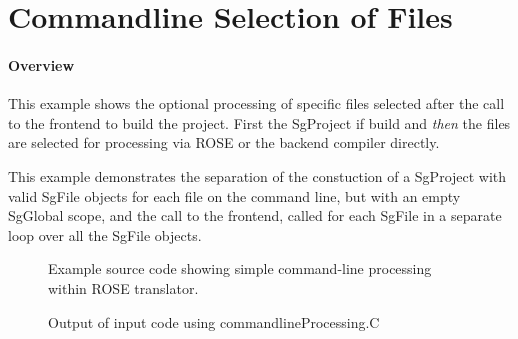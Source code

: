 \section{Commandline Selection of Files}

\paragraph{Overview} This example shows the optional processing of specific files selected
after the call to the frontend to build the project.  First the SgProject if build and
{\em then} the files are selected for processing via ROSE or the backend compiler
directly.

   This example demonstrates the separation of the constuction of a SgProject with
valid SgFile objects for each file on the command line, but with an empty SgGlobal scope,
and the call to the frontend, called for each SgFile in a separate loop over all the 
SgFile objects.

\begin{figure}[!h]
{\indent
{\mySmallFontSize

\label{Tutorial:exampleCommandlineProcessing}

\begin{latexonly}
   
\end{latexonly}

\begin{htmlonly}
   
\end{htmlonly}

}
}
\caption{Example source code showing simple command-line processing within ROSE translator.}
\end{figure}


\begin{figure}[!h]
{\indent
{\mySmallFontSize

\label{Tutorial:exampleOutput_CommandlineProcessing}

\begin{latexonly}
   
\end{latexonly}

\begin{htmlonly}
   
\end{htmlonly}

}
}
\caption{Output of input code using commandlineProcessing.C}
\end{figure}





